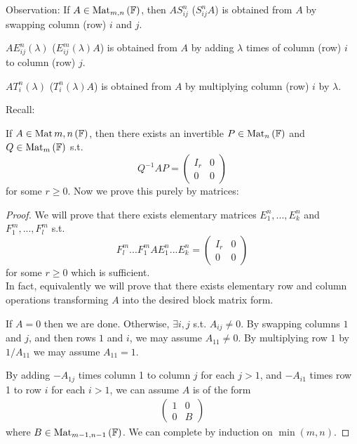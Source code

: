\documentclass[a4paper]{article}
\begin{document}
Observation: If $A\in \operatorname{Mat}_{m,n}\left(\mathbb{F}\right)$, then $AS_{ij}^n$ ($S_{ij}^n A$) is obtained from $A$ by swapping column (row) $i$ and $j$.

$AE_{ij}^n \left(\lambda\right)$ ($E_{ij}^m \left(\lambda\right) A$) is obtained from $A$ by adding $\lambda$ times of column (row) $i$ to column (row) $j$.

$AT_i^n\left(\lambda\right)$ ($T_i^n\left(\lambda\right) A$) is obtained from $A$ by multiplying column (row) $i$ by $\lambda$.

Recall:
\begin{prop}
If $A \in \operatorname{Mat}{m,n}\left(\mathbb{F}\right)$, then there exists an invertible $P \in \operatorname{Mat}_{n}\left(\mathbb{F}\right)$ and $Q \in \operatorname{Mat}_{m}\left(\mathbb{F}\right)$ s.t. $$Q^{-1}AP = \left(\begin{matrix}
I_r & 0\\
0 & 0
\end{matrix}
\right)$$
for some $r \geq 0$. Now we prove this purely by matrices:
\begin{proof}
We will prove that there exists elementary matrices $E_1^n,...,E_k^n$ and $F_1^m,...,F_l^m$ s.t. $$F_l^m ... F_1^m A E_1^n ... E_k^n = \left(\begin{matrix}
I_r & 0\\
0 & 0
\end{matrix}
\right)$$
for some $r\geq 0$ which is sufficient.\\
In fact, equivalently we will prove that there exists elementary row and column operations transforming $A$ into the desired block matrix form.

If $A=0$ then we are done. Otherwise, $\exists i,j$ s.t. $A_{ij} \neq 0$. By swapping columns $1$ and $j$, and then rows $1$ and $i$, we may assume $A_{11} \neq 0$. By multiplying row $1$ by $1/A_{11}$ we may assume $A_{11} = 1$.

By adding $-A_{1j}$ times column 1 to column $j$ for each $j>1$, and $-A_{i1}$ times row 1 to row $i$ for each $i>1$, we can assume $A$ is of the form
\begin{equation*}
\begin{aligned}
\left(\begin{matrix}
1 & 0\\
0 & B
\end{matrix}
\right)
\end{aligned}
\end{equation*}
where $B \in \operatorname{Mat}_{m-1,n-1} \left(\mathbb{F}\right)$. We can complete by induction on $\min\left(m,n\right)$.
\end{proof}
\end{prop}
\end{document}
